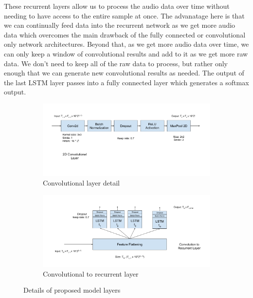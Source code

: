 \documentclass{article}
\begin{document}
These recurrent layers allow us to process
the audio data over time without needing to have access to the entire
sample at once. The advanatage here is that we can continually feed
data into the recurrent network as we get more audio data which
overcomes the main drawback of the fully connected or convolutional
only network architectures. Beyond that, as we get more audio data
over time, we can only keep a window of convolutional results and add
to it as we get more raw data. We don't need to keep all of the raw
data to process, but rather only enough that we can generate new
convolutional results as needed. The output of the last LSTM layer
passes into a fully connected layer which generates a softmax output.

\begin{figure}
  \begin{subfigure}{.5\linewidth}
    \includegraphics[width=\linewidth]{images/crnn-conv_layer}
    \caption{Convolutional layer detail}
    \label{fig:crnn-conv}
  \end{subfigure}%
  \begin{subfigure}{.5\linewidth}
    \includegraphics[width=\linewidth]{images/crnn-lstm_layer}
    \caption{Convolutional to recurrent layer}
    \label{fig:crnn-lstm}
  \end{subfigure}
  \caption{Details of proposed model layers}
\end{figure}
\end{document}
